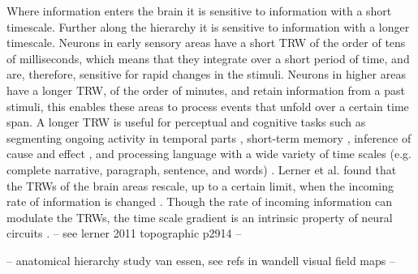 Where information enters the brain it is sensitive to information with a short timescale. Further along the hierarchy it is sensitive to information with a longer timescale.
Neurons in early sensory areas have a short TRW of the order of tens of milliseconds, which means that they integrate over a short period of time, and are, therefore, sensitive for rapid changes in the stimuli.
Neurons in higher areas have a longer TRW, of the order of minutes, and retain information from a past stimuli, this enables these areas to process events that unfold over a certain time span\cite{hasson2008hierarchy, lerner2011topographic, honey2012slow}. 
A longer TRW is useful for perceptual and cognitive tasks such as segmenting ongoing activity in temporal parts \cite{zacks2001human,hasson2008hierarchy}, short-term memory \cite{hasson2015hierarchical, durstewitz2000neurocomputational}, inference of cause and effect \cite{fonlupt2003perception}, and processing language with a wide variety of time scales (e.g. complete narrative, paragraph, sentence, and words) \cite{xu2005language, lerner2011topographic}.
Lerner et al. found that the TRWs of the brain areas rescale, up to a certain limit, when the incoming rate of information is changed \cite{lerner2014temporal}.
Though the rate of incoming information can modulate the TRWs, the time scale gradient is an intrinsic property of neural circuits \cite{stephens2013place}.
-- see lerner 2011 topographic p2914 -- 


-- anatomical hierarchy study van essen, see refs in wandell visual field maps --
